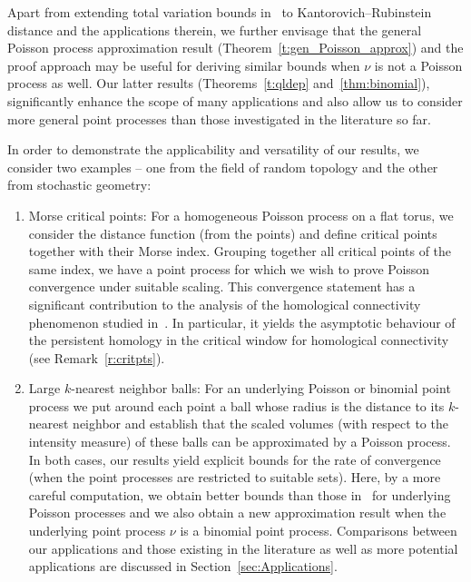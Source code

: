 \documentclass[AHL,Unicode,longabstracts]{cedram}
\begin{document}
Apart from extending total variation bounds in~\cite{Otto2020} to Kantorovich--Rubinstein distance and the applications therein, we further envisage that the general Poisson process approximation result (Theorem~\ref{t:gen_Poisson_approx}) and the proof approach may be useful for deriving similar bounds when $\nu$ is not a Poisson process as well. Our latter results (Theorems~\ref{t:qldep} and~\ref{thm:binomial}), significantly enhance the scope of many applications and also allow us to consider more general point processes than those investigated in the literature so far.

In order to demonstrate the applicability and versatility of our results, we consider two examples -- one from the field of random topology and the other from stochastic geometry:
\begin{enumerate}
\item Morse critical points: For a homogeneous Poisson process on a flat torus, we consider the distance function (from the points) and define critical points together with their Morse index. Grouping together all critical points of the same index, we have a point process for which we wish to prove Poisson convergence under suitable scaling. This convergence statement has a significant contribution to the analysis of the homological connectivity phenomenon studied in~\cite{Bobrowski2019}. In particular, it yields the asymptotic behaviour of the persistent homology in the critical window for homological connectivity (see Remark~\ref{r:critpts}).

\item Large $k$-nearest neighbor balls: For an underlying Poisson or binomial point process we put around each point a ball whose radius is the distance to its $k$-nearest neighbor and establish that {the scaled volumes (with respect to the intensity measure)} of these balls can be approximated by a Poisson process. In both cases, our results yield explicit bounds for the rate of convergence (when the point processes are restricted to suitable sets). Here, by a more careful computation, we obtain better bounds than those in~\cite[Theorem~4.2]{Otto2020} for {underlying Poisson processes} and we also obtain a new approximation result when the underlying point process $\nu$ is a {binomial} point process. Comparisons between our applications and those existing in the literature as well as more potential applications are discussed in Section~\ref{sec:Applications}.
\end{enumerate}
\end{document}

